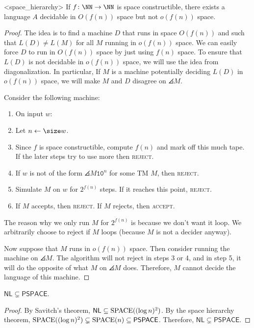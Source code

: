 \documentclass{scrartcl}
\begin{document}
\begin{theorem}<space_hierarchy>
	If \(f \colon \NN \to \NN\) is space constructible, there exists a language \(A\) decidable in \(O(f(n))\) space but not \(o(f(n))\) space.
\end{theorem}
\begin{proof}
	The idea is to find a machine \(D\) that runs in space \(O(f(n))\) and such that \(L(D) \neq L(M)\) for all \(M\) running in \(o(f(n))\) space. We can easily force \(D\) to run in \(O(f(n))\) space by just using \(f(n)\) space. To ensure that \(L(D)\) is not decidable in \(o(f(n))\) space, we will use the idea from diagonalization. In particular, If \(M\) is a machine potentially deciding \(L(D)\) in \(o(f(n))\) space, we will make \(M\) and \(D\) disagree on \(\angles M\).
	
	Consider the following machine:
	\begin{enumerate}[start=0]
		\item On input \(w\):
		\item Let \(n \gets \size w\).
		\item Since \(f\) is space constructible, compute \(f(n)\) and mark off this much tape. If the later steps try to use more then \textsc{reject}.
		\item If \(w\) is not of the form \(\angles M \mathtt 1 \mathtt 0^n\) for some \textsf{TM} \(M\), then \textsc{reject}.
		\item Simulate \(M\) on \(w\) for \(2^{f(n)}\) steps. If it reaches this point, \textsc{reject}.
		\item If \(M\) accepts, then \textsc{reject}. If \(M\) rejects, then \textsc{accept}.
	\end{enumerate}

	The reason why we only run \(M\) for \(2^{f(n)}\) is because we don't want it loop. We arbitrarily choose to reject if \(M\) loops (because \(M\) is not a decider anyway).

	Now suppose that \(M\) runs in \(o(f(n))\) space. Then consider running the machine on \(\angles M\). The algorithm will not reject in steps 3 or 4, and in step 5, it will do the opposite of what \(M\) on \(\angles M\) does. Therefore, \(M\) cannot decide the language of this machine.
\end{proof}

\begin{corollary}
	\(\mathsf{NL} \subsetneq \mathsf{PSPACE}\).
\end{corollary}
\begin{proof}
	By Savitch's theorem, \(\mathsf{NL} \subseteq \operatorname{SPACE}((\log n)^2)\). By the space hierarchy theorem, \(\operatorname{SPACE}((\log n)^2) \subsetneq \operatorname{SPACE}(n) \subseteq \mathsf{PSPACE}\). Therefore, \(\mathsf{NL} \subsetneq \mathsf{PSPACE}\).
\end{proof}
\end{document}
